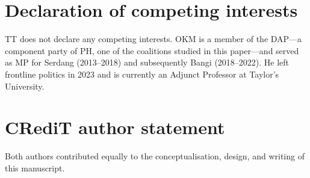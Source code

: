 \documentclass[11pt]{article}
\begin{document}
\section*{Declaration of competing interests}

TT does not declare any competing interests. OKM is a member of the DAP---a component party of PH, one of the coalitions studied in this paper---and served as MP for Serdang (2013--2018) and subsequently Bangi (2018--2022). He left frontline politics in 2023 and is currently an Adjunct Professor at Taylor's University.

\section*{CRediT author statement}
Both authors contributed equally to the conceptualisation, design, and writing of this manuscript.

\newpage


\end{document}
